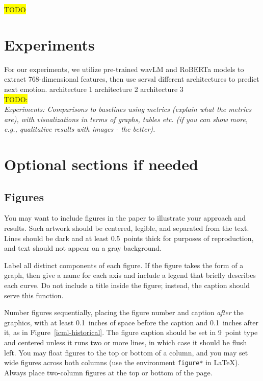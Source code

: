 \documentclass{article}
\begin{document}
\colorbox{yellow}{TODO}\\


\section{Experiments}
For our experiments, we utilize pre-trained wavLM and RoBERTa
models to extract 768-dimensional features, then use serval different architectures to predict next emotion.
architecture 1
architecture 2
architecture 3
\\ \colorbox{yellow}{TODO:}\\
\textit{Experiments: Comparisons to baselines using metrics (explain what the metrics are), with visualizations in terms of graphs, tables etc. (if you can show more, e.g., qualitative results with images - the better).}\\


\section{Optional sections if needed}

\subsection{Figures}

You may want to include figures in the paper to illustrate
your approach and results. Such artwork should be centered,
legible, and separated from the text. Lines should be dark and at
least 0.5~points thick for purposes of reproduction, and text should
not appear on a gray background.

Label all distinct components of each figure. If the figure takes the
form of a graph, then give a name for each axis and include a legend
that briefly describes each curve. Do not include a title inside the
figure; instead, the caption should serve this function.

Number figures sequentially, placing the figure number and caption
\emph{after} the graphics, with at least 0.1~inches of space before
the caption and 0.1~inches after it, as in
Figure~\ref{icml-historical}. The figure caption should be set in
9~point type and centered unless it runs two or more lines, in which
case it should be flush left. You may float figures to the top or
bottom of a column, and you may set wide figures across both columns
(use the environment \texttt{figure*} in \LaTeX). Always place
two-column figures at the top or bottom of the page.
\end{document}
